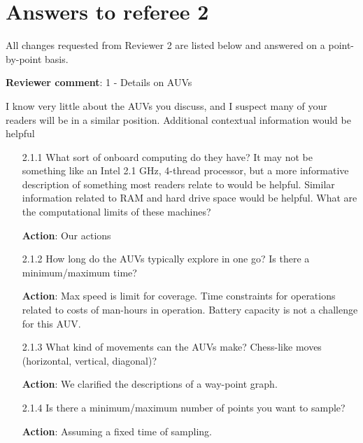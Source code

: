 \documentclass[a4paper]{article}
\newcounter{reviewer}
\def\revcom{\textbf{Reviewer comment}}
\def\action{\textbf{Action}}
\begin{document}

\section*{Answers to referee 2}
All changes requested from Reviewer 2 are listed below and answered on a point-by-point basis.

\setcounter{reviewer}{2}

\begin{answers}
\item{\revcom:  1 - Details on AUVs}\label{r2c1}

I know very little about the AUVs you discuss, and I suspect many of your readers will be in a similar position. Additional contextual information would be helpful

\begin{itemize}[noitemsep,topsep=0pt,parsep=0pt,partopsep=0pt]

\item[2.1.1] What sort of onboard computing do they have? It may not be something like an Intel 2.1 GHz, 4-thread processor, but a more informative description of something most readers relate to would be helpful. Similar information related to RAM and hard drive space would be helpful. What are the computational limits of these machines?\par
\action: Our actions
\vspace{1em}

\item[2.1.2] How long do the AUVs typically explore in one go? Is there a minimum/maximum time?\par 
\action: Max speed is limit for coverage. Time constraints for operations related to costs of man-hours in operation. Battery capacity is not a challenge for this AUV. 
\vspace{1em}

\item[2.1.3] What kind of movements can the AUVs make? Chess-like moves (horizontal, vertical, diagonal)?\par  
\action: We clarified the descriptions of a way-point graph.
\vspace{1em}

\item[2.1.4] Is there a minimum/maximum number of points you want to sample?\par
\action: Assuming a fixed time of sampling.
\vspace{1em}


\end{itemize}
\end{answers}
\end{document}
